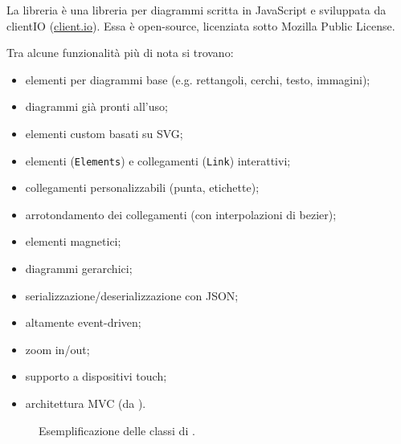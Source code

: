 La libreria \jointjs{} è una libreria per diagrammi scritta in JavaScript e sviluppata da clientIO (\url{client.io}). Essa è open-source, licenziata sotto Mozilla Public License.

Tra alcune funzionalità più di nota si trovano:
\begin{itemize}
	\item elementi per diagrammi base (e.g. rettangoli, cerchi, testo, immagini);
	\item diagrammi già pronti all'uso;
	\item elementi custom basati su SVG;
	\item elementi (\texttt{Elements}) e collegamenti (\texttt{Link}) interattivi;
	\item collegamenti personalizzabili (punta, etichette);
	\item arrotondamento dei collegamenti (con interpolazioni di bezier);
	\item elementi magnetici;
	\item diagrammi gerarchici;
	\item serializzazione/deserializzazione con JSON;
	\item altamente event-driven;
	\item zoom in/out;
	\item supporto a dispositivi touch;
	\item architettura MVC (da \backbonejs).
\end{itemize}

\begin{figure}[H]
	\caption{Esemplificazione delle classi di \jointjs.}
\end{figure}

